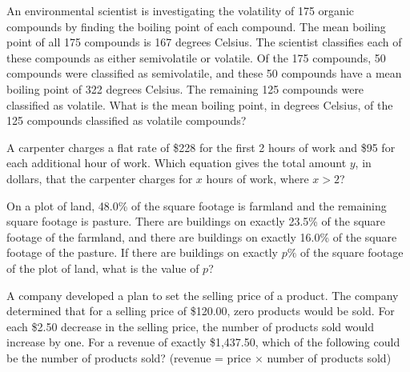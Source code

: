 \vspace{2em}
\newpage

\noindent\markforreview
\vspace{1em}

An environmental scientist is investigating the volatility of 175 organic compounds by finding the boiling point of each compound.  
The mean boiling point of all 175 compounds is 167 degrees Celsius.  
The scientist classifies each of these compounds as either semivolatile or volatile.  
Of the 175 compounds, 50 compounds were classified as semivolatile, and these 50 compounds have a mean boiling point of 322 degrees Celsius.  
The remaining 125 compounds were classified as volatile.  
What is the mean boiling point, in degrees Celsius, of the 125 compounds classified as volatile compounds?

\vspace{2em}
\newpage

\noindent\markforreview
\vspace{1em}

A carpenter charges a flat rate of \$228 for the first 2 hours of work and \$95 for each additional hour of work.  
Which equation gives the total amount $y$, in dollars, that the carpenter charges for $x$ hours of work, where $x > 2$?

\vspace{0.75em}


\vspace{2em}
\newpage

\noindent\markforreview
\vspace{1em}

On a plot of land, 48.0\% of the square footage is farmland and the remaining square footage is pasture.  
There are buildings on exactly 23.5\% of the square footage of the farmland, and there are buildings on exactly 16.0\% of the square footage of the pasture.  
If there are buildings on exactly $p\%$ of the square footage of the plot of land, what is the value of $p$?

\vspace{2em}
\newpage

\noindent\markforreview
\vspace{1em}

A company developed a plan to set the selling price of a product.  
The company determined that for a selling price of \$120.00, zero products would be sold.  
For each \$2.50 decrease in the selling price, the number of products sold would increase by one.  
For a revenue of exactly \$1,437.50, which of the following could be the number of products sold?  
(revenue = price $\times$ number of products sold)


